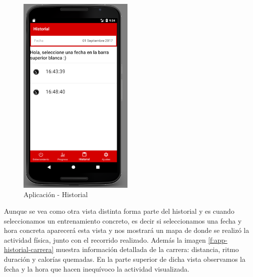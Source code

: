 \documentclass[a4paper, 11pt]{article}
\begin{document}
\begin{itemize}
                            \begin{figure}[H]
                             \centering
                             \includegraphics[width=0.5\textwidth]{8historial-lista}
                             \caption{Aplicación - Historial}
                             \label{f:app-historial-lista}
                            \end{figure}

  Aunque se vea como otra vista distinta forma parte del historial y es cuando seleccionamos un entrenamiento
  concreto, es decir si seleccionamos una fecha y hora concreta aparecerá esta vista y nos mostrará un mapa
  de donde se realizó la actividad física, junto con el recorrido realizado. Además la imagen
  \ref{f:app-historial-carrera} muestra información detallada de la carrera: distancia, ritmo duración y
  calorías quemadas. En la parte superior de dicha vista observamos la fecha y la hora que hacen inequívoco la
  actividad visualizada.\\


\end{itemize}
\end{document}
